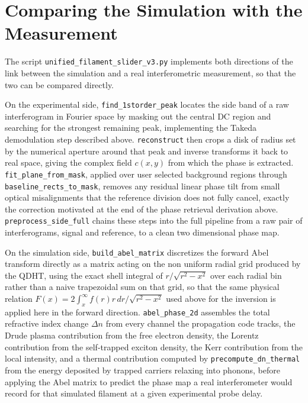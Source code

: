 \section{Comparing the Simulation with the Measurement}
\label{sec:comparison}

The script \texttt{unified\_filament\_slider\_v3.py} implements both directions of the link between the simulation and a real interferometric measurement, so that the two can be compared directly.

On the experimental side, \texttt{find\_1storder\_peak} locates the side band of a raw interferogram in Fourier space by masking out the central DC region and searching for the strongest remaining peak, implementing the Takeda demodulation step described above. \texttt{reconstruct} then crops a disk of radius set by the numerical aperture around that peak and inverse transforms it back to real space, giving the complex field $c(x,y)$ from which the phase is extracted. \texttt{fit\_plane\_from\_mask}, applied over user selected background regions through \texttt{baseline\_rects\_to\_mask}, removes any residual linear phase tilt from small optical misalignments that the reference division does not fully cancel, exactly the correction motivated at the end of the phase retrieval derivation above. \texttt{preprocess\_side\_full} chains these steps into the full pipeline from a raw pair of interferograms, signal and reference, to a clean two dimensional phase map.

On the simulation side, \texttt{build\_abel\_matrix} discretizes the forward Abel transform directly as a matrix acting on the non uniform radial grid produced by the QDHT, using the exact shell integral of $r/\sqrt{r^2-x^2}$ over each radial bin rather than a naive trapezoidal sum on that grid, so that the same physical relation $F(x)=2\int_x^\infty f(r)r\,dr/\sqrt{r^2-x^2}$ used above for the inversion is applied here in the forward direction. \texttt{abel\_phase\_2d} assembles the total refractive index change $\Delta n$ from every channel the propagation code tracks, the Drude plasma contribution from the free electron density, the Lorentz contribution from the self-trapped exciton density, the Kerr contribution from the local intensity, and a thermal contribution computed by \texttt{precompute\_dn\_thermal} from the energy deposited by trapped carriers relaxing into phonons, before applying the Abel matrix to predict the phase map a real interferometer would record for that simulated filament at a given experimental probe delay.

